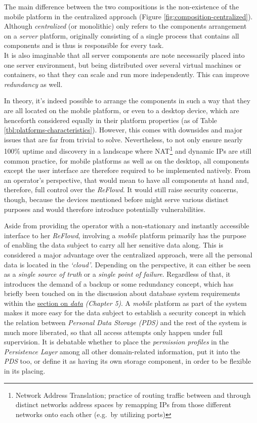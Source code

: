 \documentclass[12pt,english,a4paper,titlepage,cleardoublepage=empty,dottedtoc]{report}
\begin{document}
The main difference between the two compositions is the non-existence of
the mobile platform in the centralized approach (Figure
\ref{fig:composition-centralized}). Although \emph{centralized} (or
monolithic) only refers to the components arrangement on a \emph{server}
platform, originally consisting of a single process that contains all
components and is thus is responsible for every task.\\
It is also imaginable that all server components are note necessarily
placed into one server environment, but being distributed over several
virtual machines or containers, so that they can scale and run more
independently. This can improve \emph{redundancy} as well.

In theory, it's indeed possible to arrange the components in such a way
that they are all located on the mobile platform, or even to a desktop
device, which are henceforth considered equally in their platform
properties (as of Table \ref{tbl:platforms-characteristics}). However,
this comes with downsides and major issues that are far from trivial to
solve. Nevertheless, to not only ensure nearly 100\% uptime and
discovery in a landscape where NAT\footnote{Network Address Translation;
  practice of routing traffic between and through distinct networks
  address spaces by remapping IPs from those different networks onto
  each other (e.g.~by utilizing ports)} and dynamic IPs are still common
practice, for mobile platforms as well as on the desktop, all components
except the user interface are therefore required to be implemented
natively. From an operator's perspective, that would mean to have all
components at hand and, therefore, full control over the \emph{ReFlowd}.
It would still raise security concerns, though, because the devices
mentioned before might serve various distinct purposes and would
therefore introduce potentially vulnerabilities.

Aside from providing the operator with a non-stationary and instantly
accessible interface to her \emph{ReFlowd}, involving a \emph{mobile}
platform primarily has the purpose of enabling the data subject to carry
all her sensitive data along. This is considered a major advantage over
the centralized approach, were all the personal data is located in the
\emph{`cloud'}. Depending on the perspective, it can either be seen as a
\emph{single source of truth} or a \emph{single point of failure}.
Regardless of that, it introduces the demand of a backup or some
redundancy concept, which has briefly been touched on in the discussion
about database system requirements within the
\protect\hyperlink{data}{section on \emph{data}} \emph{(Chapter 5)}. A
\emph{mobile} platform as part of the system makes it more easy for the
data subject to establish a security concept in which the relation
between \emph{Personal Data Storage (PDS)} and the rest of the system is
much more liberated, so that all access attempts only happen under full
supervision. It is debatable whether to place the \emph{permission
profiles} in the \emph{Persistence Layer} among all other domain-related
information, put it into the \emph{PDS} too, or define it as having its
own storage component, in order to be flexible in its placing.
\end{document}
